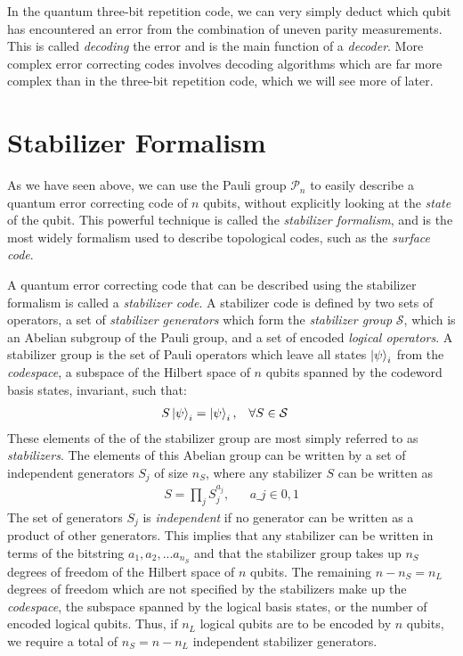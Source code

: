 In the quantum three-bit repetition code, we can very simply deduct which qubit has encountered an error from the combination of uneven parity measurements. This is called \emph{decoding} the error and is the main function of a \emph{decoder}. More complex error correcting codes involves decoding algorithms which are far more complex than in the three-bit repetition code, which we will see more of later.


\section{Stabilizer Formalism}

As we have seen above, we can use the Pauli group $\mathcal{P}_n$ to easily describe a quantum error correcting code of $n$ qubits, without explicitly looking at the \emph{state} of the qubit. This powerful technique is called the \emph{stabilizer formalism}, and is the most widely formalism used to describe topological codes, such as the \emph{surface code}.

A quantum error correcting code that can be described using the stabilizer formalism is called a \emph{stabilizer code}. A stabilizer code is defined by two sets of operators, a set of \emph{stabilizer generators} which form the \emph{stabilizer group} $\mathcal{S}$, which is an Abelian subgroup of the Pauli group, and a set of encoded \emph{logical operators}. A stabilizer group is the set of Pauli operators which leave all states $\ket{\psi}_i$ from the \emph{codespace}, a subspace of the Hilbert space of $n$ qubits spanned by the codeword basis states, invariant, such that:
\begin{align}
  & S\ket{\psi}_i = \ket{\psi}_i, && \forall S \in \mathcal{S} &
\end{align}
These elements of the of the stabilizer group are most simply referred to as \emph{stabilizers}. The elements of this Abelian group can be written by a set of independent generators $S_j$ of size $n_S$, where any stabilizer $S$ can be written as
\begin{align}
 & S = \prod_{j}S_j^{a_j}, && a\_j \in {0, 1} &
\end{align}
The set of generators $S_j$ is \emph{independent} if no generator can be written as a product of other generators. This implies that any stabilizer can be written in terms of the bitstring $a_1, a_2, ...a_{n_S}$ and that the stabilizer group takes up $n_S$ degrees of freedom of the Hilbert space of $n$ qubits. The remaining $n-n_S = n_L$ degrees of freedom which are not specified by the stabilizers make up the \emph{codespace}, the subspace spanned by the logical basis states, or the number of encoded logical qubits. Thus, if $n_L$ logical qubits are to be encoded by $n$ qubits, we require a total of $n_S = n-n_L$ independent stabilizer generators.


